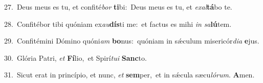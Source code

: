 {\numbfont\textcolor{\numbcolor}{27.}}~Deus meus es tu, et confité\textit{bor} \textbf{ti}\-bi:~\star Deus meus es tu, et \textit{ex}\-\textit{al}\textbf{tá}bo te.\par
{\numbfont\textcolor{\numbcolor}{28.}}~Confitébor tibi quóniam ex\-\textit{au}\-\textbf{dís}ti me:~\star et factus es mihi \textit{in} \textit{sa}\-\textbf{lú}tem.\par
{\numbfont\textcolor{\numbcolor}{29.}}~Confitémini Dómino quóni\textit{am} \textbf{bo}\-nus:~\star quóniam in sǽculum misericór\-\textit{di}\-\textit{a} \textbf{e}\-jus.\par
{\numbfont\textcolor{\numbcolor}{30.}}~Glória Patri, \textit{et} \textbf{Fí}\-lio,~\star et Spirí\-\textit{tu}\-\textit{i} \textbf{Sanc}\-to.\par
{\numbfont\textcolor{\numbcolor}{31.}}~Sicut erat in princípio, et nunc, \textit{et} \textbf{sem}\-per,~\star et in sǽcula sæcu\-\textit{ló}\-\textit{rum}. \textbf{A}\-men.\par
